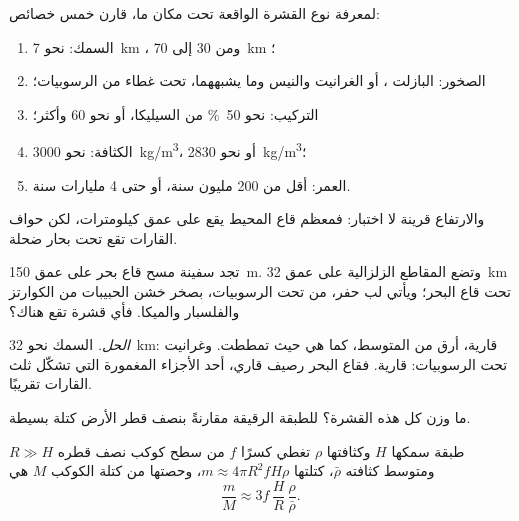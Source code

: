 \begin{method}\label{met:g12:continental-crust:compare}
لمعرفة نوع القشرة الواقعة تحت مكان ما، قارن خمس خصائص:
\begin{enumerate}
  \item السمك: نحو \qty{7}{km} ، ومن 30 إلى
        \qty{70}{km} ؛
  \item الصخور: البازلت ، أو الغرانيت والنيس وما يشبههما،
        تحت غطاء من الرسوبيات؛
  \item التركيب: نحو \qty{50}{\percent} من السيليكا، أو نحو 60
        وأكثر؛
  \item الكثافة: نحو \qty{3000}{kg/m^3}، أو نحو \qty{2830}{kg/m^3}؛
  \item العمر: أقل من 200 مليون سنة، أو حتى 4 مليارات سنة.
\end{enumerate}
والارتفاع قرينة لا اختبار: فمعظم قاع المحيط يقع على عمق
كيلومترات، لكن حواف القارات تقع تحت بحار ضحلة.
\end{method}

\begin{example}\label{ex:g12:continental-crust:shelf}
تجد سفينة مسح قاع بحر على عمق \qty{150}{m}. وتضع المقاطع الزلزالية
 على عمق \qty{32}{km} تحت قاع البحر؛ ويأتي لب حفر، من تحت
الرسوبيات، بصخر خشن الحبيبات من الكوارتز والفلسبار والميكا. فأي قشرة
تقع هناك؟

\emph{الحل.} السمك نحو \qty{32}{km}: قارية، أرق من
المتوسط، كما هي حيث تمططت. وغرانيت تحت الرسوبيات:
قارية. فقاع البحر رصيف قاري، أحد الأجزاء المغمورة
التي تشكّل ثلث القارات تقريبًا.
\end{example}

ما وزن كل هذه القشرة؟ للطبقة الرقيقة مقارنةً بنصف قطر الأرض
كتلة بسيطة.

\begin{proposition}\label{prop:g12:continental-crust:thin-layer}
طبقة سمكها $H$ وكثافتها $\rho$ تغطي كسرًا $f$ من
سطح كوكب نصف قطره $R \gg H$ ومتوسط كثافته $\bar\rho$، كتلتها
$m \approx 4\pi R^2 f H \rho$، وحصتها من كتلة الكوكب $M$ هي
\[
  \frac{m}{M} \approx 3 f\,\frac{H}{R}\,\frac{\rho}{\bar\rho}.
\]
\end{proposition}

